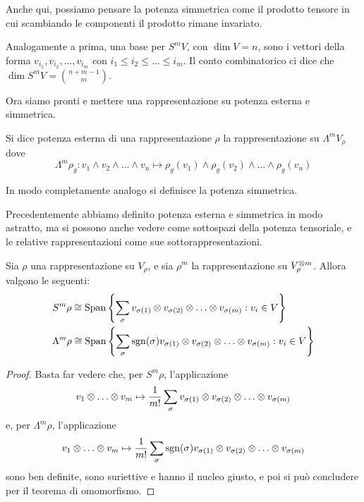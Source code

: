 Anche qui, possiamo pensare la potenza simmetrica come il prodotto tensore in cui scambiando le componenti il prodotto rimane invariato.

Analogamente a prima, una base per $S^mV$, con $\dim V=n$, sono i vettori della forma  $v_{i_1},v_{i_2},\dots,v_{i_m}$ con $i_1\le i_2\le \dots \le i_m$. Il conto combinatorico ci dice che $\dim S^mV = \binom{n+m-1}m$.


Ora siamo pronti e mettere una rappresentazione su potenza esterna e simmetrica.



\begin{mydef}
  Si dice potenza esterna di una rappresentazione $\rho$ la rappresentazione su $\Lambda^m V_\rho$ dove
  \[
  \Lambda^m\rho_g: v_1 \wedge v_2 \wedge \dots \wedge v_n \mapsto \rho_g(v_1) \wedge \rho_g(v_2) \wedge \dots \wedge \rho_g(v_n)
  \]
  
  In modo completamente analogo si definisce la potenza simmetrica.

\end{mydef}

Precedentemente abbiamo definito potenza esterna e simmetrica in modo astratto, ma si possono anche vedere come sottospazi della potenza tensoriale, e le relative rappresentazioni come sue sottorappresentazioni.

\begin{myprop}
  Sia $\rho$ una rappresentazione su $V_\rho$, e sia $\rho^m$ la rappresentazione su $V_\rho^{\otimes m}$. Allora valgono le seguenti: 
  \begin{eqnarray*}
  &S^m\rho \isom \Span{\left\{\sum_\sigma v_{\sigma(1)}\tensor v_{\sigma(2)} \tensor \dots \tensor v_{\sigma(m)}:v_i \in V\right\}}\\
  &\Lambda^m\rho \isom \Span{\left\{\sum_\sigma \sgn(\sigma) v_{\sigma(1)}\tensor v_{\sigma(2)} \tensor \dots \tensor v_{\sigma(m)}:v_i \in V\right\}} 
  \end{eqnarray*}

\end{myprop}

\begin{proof}
  Basta far vedere che, per $S^m\rho$, l'applicazione
  \[
  v_1 \tensor \dots \tensor v_m \mapsto \frac1{m!} \sum_\sigma v_{\sigma(1)}\tensor v_{\sigma(2)} \tensor \dots \tensor v_{\sigma(m)}
  \]
  e, per $\Lambda^m\rho$, l'applicazione
  \[
  v_1 \tensor \dots \tensor v_m \mapsto \frac1{m!} \sum_\sigma \sgn(\sigma) v_{\sigma(1)}\tensor v_{\sigma(2)} \tensor \dots \tensor v_{\sigma(m)}
  \] sono ben definite, sono suriettive e hanno il nucleo giusto, e poi si può concludere per il teorema di omomorfismo. 
\end{proof}

